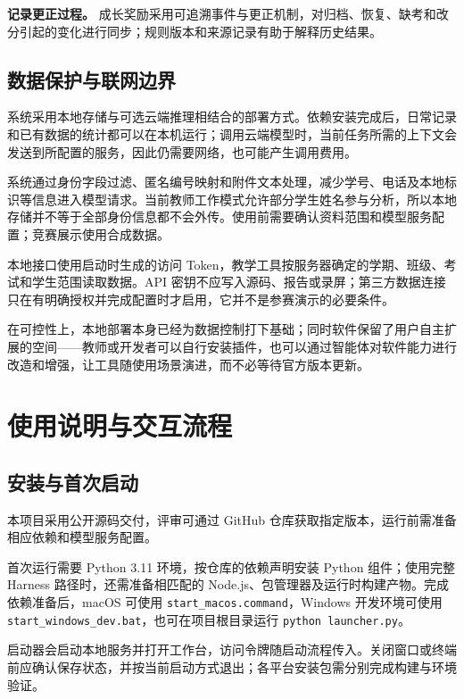 \documentclass[11pt,a4paper,fontset=none]{ctexart}
\begin{document}
\textbf{记录更正过程。} 成长奖励采用可追溯事件与更正机制，对归档、恢复、缺考和改分引起的变化进行同步；规则版本和来源记录有助于解释历史结果。

\subsection{数据保护与联网边界}

系统采用本地存储与可选云端推理相结合的部署方式。依赖安装完成后，日常记录和已有数据的统计都可以在本机运行；调用云端模型时，当前任务所需的上下文会发送到所配置的服务，因此仍需要网络，也可能产生调用费用。

系统通过身份字段过滤、匿名编号映射和附件文本处理，减少学号、电话及本地标识等信息进入模型请求。当前教师工作模式允许部分学生姓名参与分析，所以本地存储并不等于全部身份信息都不会外传。使用前需要确认资料范围和模型服务配置；竞赛展示使用合成数据。

本地接口使用启动时生成的访问 Token，教学工具按服务器确定的学期、班级、考试和学生范围读取数据。API 密钥不应写入源码、报告或录屏；第三方数据连接只在有明确授权并完成配置时才启用，它并不是参赛演示的必要条件。

在可控性上，本地部署本身已经为数据控制打下基础；同时软件保留了用户自主扩展的空间——教师或开发者可以自行安装插件，也可以通过智能体对软件能力进行改造和增强，让工具随使用场景演进，而不必等待官方版本更新。

\section{使用说明与交互流程}

\subsection{安装与首次启动}

本项目采用公开源码交付，评审可通过 GitHub 仓库获取指定版本，运行前需准备相应依赖和模型服务配置。

首次运行需要 Python 3.11 环境，按仓库的依赖声明安装 Python 组件；使用完整 Harness 路径时，还需准备相匹配的 Node.js、包管理器及运行时构建产物。完成依赖准备后，macOS 可使用 \texttt{start\_macos.command}，Windows 开发环境可使用 \texttt{start\_windows\_dev.bat}，也可在项目根目录运行 \texttt{python launcher.py}。

启动器会启动本地服务并打开工作台，访问令牌随启动流程传入。关闭窗口或终端前应确认保存状态，并按当前启动方式退出；各平台安装包需分别完成构建与环境验证。
\end{document}
